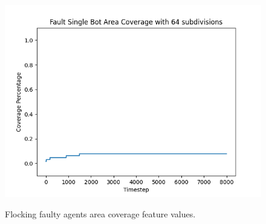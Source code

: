 \documentclass[../../Thesis.tex]{subfiles}
\begin{document}
\begin{figure}[H]
{						\includegraphics[scale=0.22]{../../Images/Experiments/flocking_15_East_6_percent_rotating_fault_after_1500_gain_1000/Fault_Single_Bot_Area_Coverage_with_64_subdivisions.png}
					}
					\caption{Flocking faulty agents area coverage feature values.}
					\label{fig:flocking_faulty agents_area_coverage}
				\end{figure}
					
\end{document}
